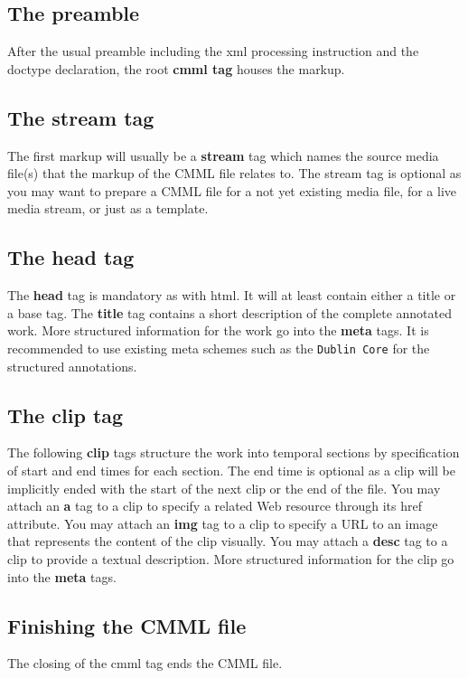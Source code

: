 \subsection{The preamble}\label{preamble}
After the usual preamble including the xml processing instruction and the doctype declaration, the root {\bf cmml tag} houses the markup.\subsection{The stream tag}\label{stream}
The first markup will usually be a {\bf stream} tag which names the source media file(s) that the markup of the CMML file relates to. The stream tag is optional as you may want to prepare a CMML file for a not yet existing media file, for a live media stream, or just as a template.\subsection{The head tag}\label{head}
The {\bf head} tag is mandatory as with html. It will at least contain either a title or a base tag. The {\bf title} tag contains a short description of the complete annotated work. More structured information for the work go into the {\bf meta} tags. It is recommended to use existing meta schemes such as the {\tt Dublin Core} for the structured annotations.\subsection{The clip tag}\label{clip}
The following {\bf clip} tags structure the work into temporal sections by specification of start and end times for each section. The end time is optional as a clip will be implicitly ended with the start of the next clip or the end of the file. You may attach an {\bf a} tag to a clip to specify a related Web resource through its href attribute. You may attach an {\bf img} tag to a clip to specify a URL to an image that represents the content of the clip visually. You may attach a {\bf desc} tag to a clip to provide a textual description. More structured information for the clip go into the {\bf meta} tags.\subsection{Finishing the CMML file}\label{end}
The closing of the cmml tag ends the CMML file. 